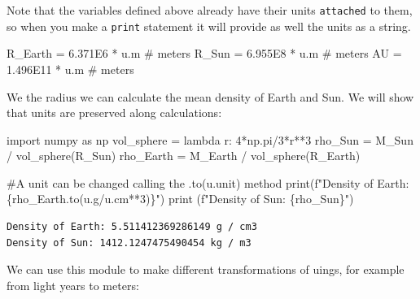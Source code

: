 \documentclass[
  letterpaper,
  DIV=11,
  numbers=noendperiod]{scrreprt}
\newenvironment{Shaded}{\begin{snugshade}}{\end{snugshade}}
\newcommand{\BuiltInTok}[1]{\textcolor[rgb]{0.00,0.23,0.31}{#1}}
\newcommand{\CommentTok}[1]{\textcolor[rgb]{0.37,0.37,0.37}{#1}}
\newcommand{\DecValTok}[1]{\textcolor[rgb]{0.68,0.00,0.00}{#1}}
\newcommand{\FloatTok}[1]{\textcolor[rgb]{0.68,0.00,0.00}{#1}}
\newcommand{\ImportTok}[1]{\textcolor[rgb]{0.00,0.46,0.62}{#1}}
\newcommand{\KeywordTok}[1]{\textcolor[rgb]{0.00,0.23,0.31}{#1}}
\newcommand{\NormalTok}[1]{\textcolor[rgb]{0.00,0.23,0.31}{#1}}
\newcommand{\OperatorTok}[1]{\textcolor[rgb]{0.37,0.37,0.37}{#1}}
\newcommand{\SpecialCharTok}[1]{\textcolor[rgb]{0.37,0.37,0.37}{#1}}
\newcommand{\SpecialStringTok}[1]{\textcolor[rgb]{0.13,0.47,0.30}{#1}}
\begin{document}
Note that the variables defined above already have their units
\texttt{attached} to them, so when you make a \texttt{print} statement
it will provide as well the units as a string.

\begin{Shaded}
\begin{Highlighting}[]
\NormalTok{R\_Earth }\OperatorTok{=} \FloatTok{6.371E6} \OperatorTok{*}\NormalTok{ u.m }\CommentTok{\# meters}
\NormalTok{R\_Sun }\OperatorTok{=} \FloatTok{6.955E8} \OperatorTok{*}\NormalTok{ u.m }\CommentTok{\# meters}
\NormalTok{AU }\OperatorTok{=} \FloatTok{1.496E11} \OperatorTok{*}\NormalTok{ u.m }\CommentTok{\# meters}
\end{Highlighting}
\end{Shaded}

We the radius we can calculate the mean density of Earth and Sun. We
will show that units are preserved along calculations:

\begin{Shaded}
\begin{Highlighting}[]
\ImportTok{import}\NormalTok{ numpy }\ImportTok{as}\NormalTok{ np}
\NormalTok{vol\_sphere }\OperatorTok{=} \KeywordTok{lambda}\NormalTok{ r: }\DecValTok{4}\OperatorTok{*}\NormalTok{np.pi}\OperatorTok{/}\DecValTok{3}\OperatorTok{*}\NormalTok{r}\OperatorTok{**}\DecValTok{3}
\NormalTok{rho\_Sun }\OperatorTok{=}\NormalTok{ M\_Sun }\OperatorTok{/}\NormalTok{ vol\_sphere(R\_Sun)}
\NormalTok{rho\_Earth }\OperatorTok{=}\NormalTok{ M\_Earth }\OperatorTok{/}\NormalTok{ vol\_sphere(R\_Earth)}

\CommentTok{\#A unit can be changed calling the .to(u.unit) method}
\BuiltInTok{print}\NormalTok{(}\SpecialStringTok{f"Density of Earth: }\SpecialCharTok{\{}\NormalTok{rho\_Earth}\SpecialCharTok{.}\NormalTok{to(u.g}\OperatorTok{/}\NormalTok{u.cm}\OperatorTok{**}\DecValTok{3}\NormalTok{)}\SpecialCharTok{\}}\SpecialStringTok{"}\NormalTok{)}
\BuiltInTok{print}\NormalTok{ (}\SpecialStringTok{f"Density of Sun: }\SpecialCharTok{\{}\NormalTok{rho\_Sun}\SpecialCharTok{\}}\SpecialStringTok{"}\NormalTok{)}
\end{Highlighting}
\end{Shaded}

\begin{verbatim}
Density of Earth: 5.511412369286149 g / cm3
Density of Sun: 1412.1247475490454 kg / m3
\end{verbatim}

We can use this module to make different transformations of uings, for
example from light years to meters:
\end{document}
